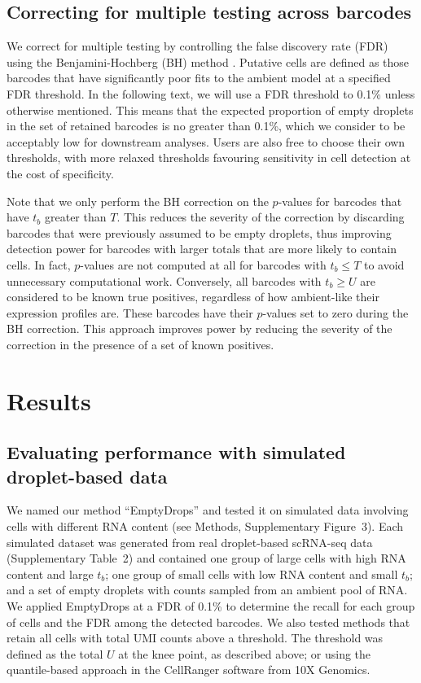 \documentclass[10pt,letterpaper]{article}
\newcommand{\supptabdataset}{2}
\newcommand{\suppfigsimdesign}{3}
\begin{document}
\subsection*{Correcting for multiple testing across barcodes}
We correct for multiple testing by controlling the false discovery rate (FDR) using the Benjamini-Hochberg (BH) method \cite{benjamini1995controlling}.
Putative cells are defined as those barcodes that have significantly poor fits to the ambient model at a specified FDR threshold.
In the following text, we will use a FDR threshold to 0.1\% unless otherwise mentioned.
This means that the expected proportion of empty droplets in the set of retained barcodes is no greater than 0.1\%,
which we consider to be acceptably low for downstream analyses.
Users are also free to choose their own thresholds, with more relaxed thresholds favouring sensitivity in cell detection at the cost of specificity.

Note that we only perform the BH correction on the $p$-values for barcodes that have $t_b$ greater than $T$.
This reduces the severity of the correction by discarding barcodes that were previously assumed to be empty droplets, thus improving detection power for barcodes with larger totals that are more likely to contain cells.
In fact, $p$-values are not computed at all for barcodes with $t_b \le T$ to avoid unnecessary computational work.
Conversely, all barcodes with $t_b \ge U$ are considered to be known true positives, regardless of how ambient-like their expression profiles are.
These barcodes have their $p$-values set to zero during the BH correction.
This approach improves power by reducing the severity of the correction in the presence of a set of known positives.

\section*{Results}

\subsection*{Evaluating performance with simulated droplet-based data}
We named our method ``EmptyDrops'' and tested it on simulated data involving cells with different RNA content (see Methods, Supplementary Figure~\suppfigsimdesign{}).
Each simulated dataset was generated from real droplet-based scRNA-seq data (Supplementary Table~\supptabdataset{}) 
and contained one group of large cells with high RNA content and large $t_b$;
one group of small cells with low RNA content and small $t_b$; 
and a set of empty droplets with counts sampled from an ambient pool of RNA.
We applied EmptyDrops at a FDR of 0.1\% to determine the recall for each group of cells and the FDR among the detected barcodes.
We also tested methods that retain all cells with total UMI counts above a threshold.
The threshold was defined as the total $U$ at the knee point, as described above;
or using the quantile-based approach \cite{zheng2017massively} in the CellRanger software from 10X Genomics.
\end{document}

